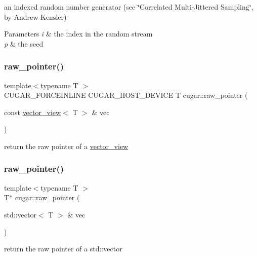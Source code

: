 an indexed random number generator (see \char`\"{}\+Correlated Multi-\/\+Jittered Sampling\char`\"{}, by Andrew Kensler)


\begin{DoxyParams}{Parameters}
{\em i} & the index in the random stream \\
\hline
{\em p} & the seed \\
\hline
\end{DoxyParams}
\mbox{\label{group___basic_ga80c5252686ff423600f5479705b013b2}} 
\subsubsection{\texorpdfstring{raw\+\_\+pointer()}{raw\_pointer()}\hspace{0.1cm}{\footnotesize\ttfamily [1/3]}}
{\footnotesize\ttfamily template$<$typename T $>$ \\
C\+U\+G\+A\+R\+\_\+\+F\+O\+R\+C\+E\+I\+N\+L\+I\+NE C\+U\+G\+A\+R\+\_\+\+H\+O\+S\+T\+\_\+\+D\+E\+V\+I\+CE T cugar\+::raw\+\_\+pointer (\begin{DoxyParamCaption}\item[{const \hyperlink{structcugar_1_1vector__view}{vector\+\_\+view}$<$ T $>$ \&}]{vec }\end{DoxyParamCaption})}

return the raw pointer of a \hyperlink{structcugar_1_1vector__view}{vector\+\_\+view} \mbox{\label{group___basic_gaeb625b52748ed0238c5734163b1b0c67}} 
\subsubsection{\texorpdfstring{raw\+\_\+pointer()}{raw\_pointer()}\hspace{0.1cm}{\footnotesize\ttfamily [2/3]}}
{\footnotesize\ttfamily template$<$typename T $>$ \\
T$\ast$ cugar\+::raw\+\_\+pointer (\begin{DoxyParamCaption}\item[{std\+::vector$<$ T $>$ \&}]{vec }\end{DoxyParamCaption})}

return the raw pointer of a std\+::vector \mbox{\label{group___basic_ga97bff3b3a7f7278e5c0430158abdd4af}} 
